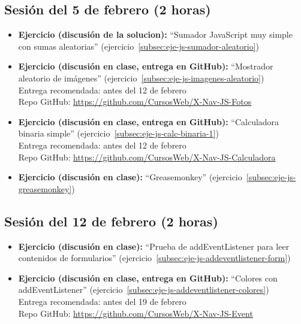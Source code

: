 \documentclass[a4paper,12pt]{report}
\begin{document}
\subsection{Sesión del 5 de febrero (2 horas)}

\begin{itemize}
\item \textbf{Ejercicio (discusión de la solucion):} ``Sumador JavaScript muy simple con sumas aleatorias'' (ejercicio~\ref{subsec:eje-js-sumador-aleatorio})
\item \textbf{Ejercicio (discusión en clase, entrega en GitHub):} ``Mostrador aleatorio de imágenes'' (ejercicio~\ref{subsec:eje-js-imagenes-aleatorio}) \\
  Entrega recomendada: antes del 12 de febrero \\
  Repo GitHub: \url{https://github.com/CursosWeb/X-Nav-JS-Fotos} \\
\item \textbf{Ejercicio (discusión en clase, entrega en GitHub):} ``Calculadora binaria simple'' (ejercicio~\ref{subsec:eje-js-calc-binaria-1}) \\
  Entrega recomendada: antes del 12 de febrero \\
  Repo GitHub: \url{https://github.com/CursosWeb/X-Nav-JS-Calculadora} \\
\item \textbf{Ejercicio (discusión en clase):} ``Greasemonkey'' (ejercicio~\ref{subsec:eje-js-greasemonkey})
\end{itemize}

\subsection{Sesión del 12 de febrero (2 horas)}

\begin{itemize}
\item \textbf{Ejercicio (discusión en clase):} ``Prueba de addEventListener para leer contenidos de formularios'' (ejercicio~\ref{subsec:eje-js-addeventlistener-form})
\item \textbf{Ejercicio (discusión en clase, entrega en GitHub):} ``Colores con addEventListener'' (ejercicio~\ref{subsec:eje-js-addeventlistener-colores}) \\
  Entrega recomendada: antes del 19 de febrero \\
  Repo GitHub: \url{https://github.com/CursosWeb/X-Nav-JS-Event} \\
\end{itemize}
\end{document}
